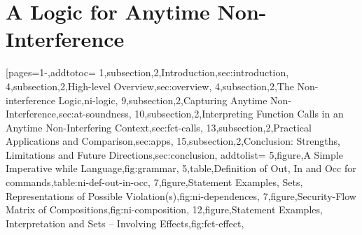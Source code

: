 \section{A Logic for Anytime Non-Interference}\label{sec:anytime}
[pages={1-},addtotoc={
1,subsection,2,Introduction,sec:introduction,
4,subsection,2,High-level Overview,sec:overview,
4,subsection,2,The Non-interference Logic,ni-logic,
9,subsection,2,Capturing Anytime Non-Interference,sec:at-soundness,
10,subsection,2,Interpreting Function Calls in an Anytime Non-Interfering Context,sec:fct-calls,
13,subsection,2,Practical Applications and Comparison,sec:apps,
15,subsection,2,{Conclusion: Strengths, Limitations and Future Directions},sec:conclusion},
addtolist={
5,figure,{A Simple Imperative while Language},fig:grammar,
5,table,{Definition of Out, In and Occ for commands},table:ni-def-out-in-occ,
7,figure,{Statement Examples, Sets, Representations of Possible Violation(s)},fig:ni-dependences,
7,figure,{Security-Flow Matrix of Compositions},fig:ni-composition,
12,figure,{Statement Examples, Interpretation and Sets -- Involving Effects},fig:fct-effect},

